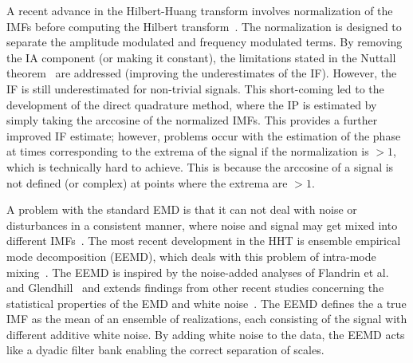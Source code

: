 \documentclass[a4paper]{IEEEtran}
\begin{document}
A recent advance in the Hilbert-Huang transform involves normalization of the IMFs before computing the Hilbert transform~\cite{Huang2005}. The normalization is designed to separate the amplitude modulated and frequency modulated terms. By removing the IA component (or making it constant), the limitations stated in the Nuttall theorem~\cite{Nuttall1966} are addressed (improving the underestimates of the IF). However, the IF is still underestimated for non-trivial signals. This short-coming led to the development of the direct quadrature method, where the IP is estimated by simply taking the arccosine of the normalized IMFs. This provides a further improved IF estimate; however, problems occur with the estimation of the phase at times corresponding to the extrema of the signal if the normalization is $>1$, which is technically hard to achieve. This is because the arccosine of a signal is not defined (or complex) at points where the extrema are $>1$. 

A problem with the standard EMD is that it can not deal with noise or disturbances in a consistent manner, where noise and signal may get mixed into different IMFs~\cite{Wu2009}. The most recent development in the HHT is ensemble empirical mode decomposition (EEMD), which deals with this problem of intra-mode mixing~\cite{Wu2009}. The EEMD is inspired by the noise-added analyses of Flandrin et al.~\cite{Flandrin2005} and Glendhill~\cite{Gledhill2003} and extends findings from other recent studies concerning the statistical properties of the EMD and white noise~\cite{Flandrin2004,Wu2004}. The EEMD defines the a true IMF as the mean of an ensemble of realizations, each consisting of the signal with different additive white noise. By adding white noise to the data, the EEMD acts like a dyadic filter bank enabling the correct separation of scales.
\end{document}
